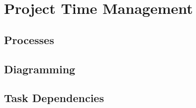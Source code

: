 \chapter{Project Time Management}

\section{Processes}

\section{Diagramming}

\section{Task Dependencies}
